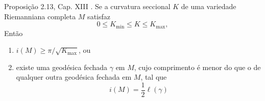 \begin{exercise}
Proposição 2.13, Cap. XIII \cite{doc}. Se a curvatura seccional $K$ de uma
variedade Riemanniana completa $M$ satisfaz
$$
0\leq K_{\operatorname{min}}\leq K\leq K_{\operatorname{max}},
$$
Então
\begin{enumerate}
\item $i(M) \geq \pi/\sqrt{K_{\operatorname{max}}}$, ou
\item existe uma geodésica fechada $\gamma$ em $M$, cujo comprimento é menor do 
que o de qualquer outra geodésica fechada em $M$, tal que
$$
i(M)=\frac{1}{2}\ell(\gamma)
$$

\end{enumerate}
\end{exercise}






